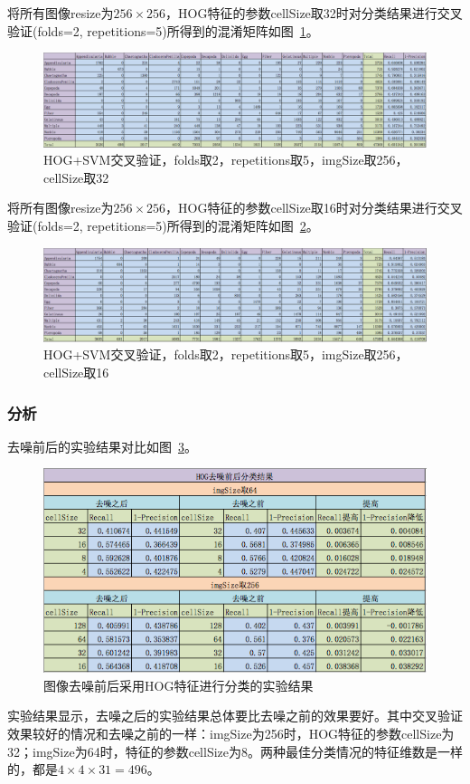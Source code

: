 \documentclass[12pt]{article}
\begin{document}
将所有图像resize为$256 \times 256$，HOG特征的参数cellSize取32时对分类结果进行交叉验证(folds=2, repetitions=5)所得到的混淆矩阵如图~\ref{fig:HOG-SVM-2-folds-5-repetitions-32-256-noNoise}。
\begin{figure}[!ht]
\centering
\includegraphics[width=1.0\linewidth]{HOG-SVM-2-folds-5-repetitions-32-256-noNoise}
\caption{HOG+SVM交叉验证，folds取2，repetitions取5，imgSize取256，cellSize取32}
\label{fig:HOG-SVM-2-folds-5-repetitions-32-256-noNoise}
\end{figure}

将所有图像resize为$256 \times 256$，HOG特征的参数cellSize取16时对分类结果进行交叉验证(folds=2, repetitions=5)所得到的混淆矩阵如图~\ref{fig:HOG-SVM-2-folds-5-repetitions-16-256-noNoise}。
\begin{figure}[!ht]
\centering
\includegraphics[width=1.0\linewidth]{HOG-SVM-2-folds-5-repetitions-16-256-noNoise}
\caption{HOG+SVM交叉验证，folds取2，repetitions取5，imgSize取256，cellSize取16}
\label{fig:HOG-SVM-2-folds-5-repetitions-16-256-noNoise}
\end{figure}

\subsubsection{分析}
去噪前后的实验结果对比如图~\ref{fig:HOG-compare}。
\begin{figure}[!ht]
\centering
\includegraphics[width=0.45\linewidth]{HOG-compare}
\caption{图像去噪前后采用HOG特征进行分类的实验结果}
\label{fig:HOG-compare}
\end{figure}
实验结果显示，去噪之后的实验结果总体要比去噪之前的效果要好。其中交叉验证效果较好的情况和去噪之前的一样：imgSize为256时，HOG特征的参数cellSize为32；imgSize为64时，特征的参数cellSize为8。两种最佳分类情况的特征维数是一样的，都是$4\times 4\times 31=496$。
\end{document}
